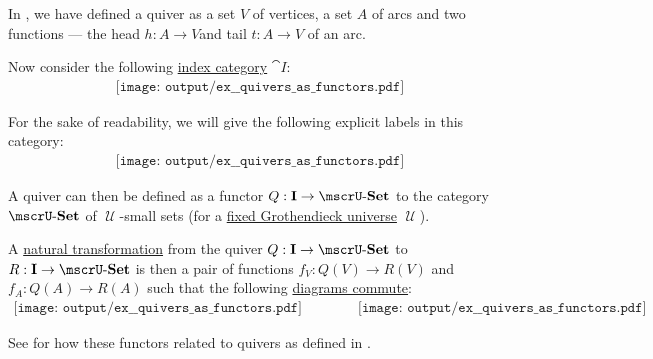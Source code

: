 \begin{example}\label{ex:quivers_as_functors}
  In , we have defined a quiver as a set \( V \) of vertices, a set \( A \) of arcs and two functions --- the head \( h: A \to V \)and tail \( t: A \to V \) of an arc.

  Now consider the following \hyperref[rem:categorical_diagram_as_functor]{index category} \( \cat{I}: \)
  \begin{equation}\label{eq:ex:quivers_as_functors/index/dots}
    \begin{aligned}
      \texttt{[image: output/ex\_\_quivers\_as\_functors.pdf]}
    \end{aligned}
  \end{equation}

  For the sake of readability, we will give the following explicit labels in this category:
  \begin{equation}\label{eq:ex:quivers_as_functors/index/annotated}
    \begin{aligned}
      \texttt{[image: output/ex\_\_quivers\_as\_functors.pdf]}
    \end{aligned}
  \end{equation}

  A quiver can then be defined as a functor \( Q: \cat{I} \to \ucat{Set} \) to the category \hyperref[def:category_of_small_sets]{\( \ucat{Set} \)} of \( \mscrU \)-small sets (for a \hyperref[def:category_size]{fixed Grothendieck universe} \( \mscrU \)).

  A \hyperref[def:natural_transformation]{natural transformation} from the quiver \( Q: \cat{I} \to \ucat{Set} \) to \( R: \cat{I} \to \ucat{Set} \) is then a pair of functions \( f_V: Q(V) \to R(V) \) and \( f_A: Q(A) \to R(A) \) such that the following \hyperref[def:categorical_diagram]{diagrams commute}:
  \begin{equation}\label{eq:ex:quivers_as_functors/index/diagram}
    \begin{aligned}
      \texttt{[image: output/ex\_\_quivers\_as\_functors.pdf]}
      \quad\quad\quad\quad
      \texttt{[image: output/ex\_\_quivers\_as\_functors.pdf]}
    \end{aligned}
  \end{equation}

  See  for how these functors related to quivers as defined in .
\end{example}

